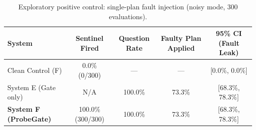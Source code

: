\begin{table}[!t]
\caption{Exploratory positive control: single-plan fault injection (noisy mode, 300 evaluations).}
\label{tab:positive_control}
\centering
\footnotesize
\begin{tabular}{lcccc}
\toprule
System & Sentinel Fired & Question Rate & Faulty Plan Applied & 95\% CI (Fault Leak) \\
\midrule
Clean Control (F) & 0.0\% (0/300) & --- & --- & [0.0\%, 0.0\%] \\
System E (Gate only) & N/A & 100.0\% & 73.3\% & [68.3\%, 78.3\%] \\
\textbf{System F (ProbeGate)} & 100.0\% (300/300) & 100.0\% & 73.3\% & [68.3\%, 78.3\%] \\
\bottomrule
\end{tabular}
\end{table}
